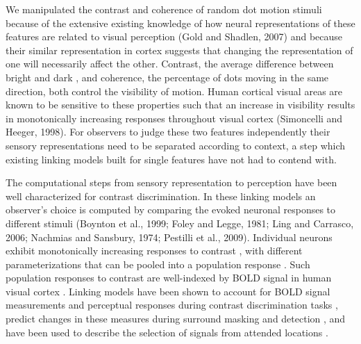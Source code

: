 \documentclass{report}
\begin{document}
We manipulated the contrast and coherence of random dot motion stimuli because of the extensive existing knowledge of how neural representations of these features are related to  visual perception (Gold and Shadlen, 2007) and because their similar representation in cortex suggests that changing the representation of one will necessarily affect the other. Contrast, the average difference between bright and dark \citep{Bex2002-it}, and coherence, the percentage of dots moving in the same direction, both control the visibility of motion. Human cortical visual areas are known to be sensitive to these properties such that an increase in visibility results in monotonically increasing responses throughout visual cortex \citep{Avidan2002-jg,Birman2018-sp,Britten1993-oh,Gardner2005-pg,Logothetis2001-kk,Olman2004-dd,Boynton1996-ff,Olman2004-dd,Rees2000-ul,Tootell1998-bb}(Simoncelli and Heeger, 1998). For observers to judge these two features independently their sensory representations need to be separated according to context, a step which existing linking models built for single features have not had to contend with.

The computational steps from sensory representation to perception have been well characterized for contrast discrimination. In these linking models an observer’s choice is computed by comparing the evoked neuronal responses to different stimuli (Boynton et al., 1999; Foley and Legge, 1981; Ling and Carrasco, 2006; Nachmias and Sansbury, 1974; Pestilli et al., 2009). Individual neurons exhibit monotonically increasing responses to contrast \citep{Albrecht1982-rq}, with different parameterizations \citep{Tolhurst1983-cv} that can be pooled into a population response \citep{Shadlen1996-pr}. Such population responses to contrast are well-indexed by BOLD signal in human visual cortex \citep{Avidan2002-jg,Boynton1996-ff,Boynton1999-jd,Gardner2005-pg,Heeger2000-pq,Logothetis2001-kk}. Linking models have been shown to account for BOLD signal measurements and perceptual responses during contrast discrimination tasks \citep{Boynton1999-jd}, predict changes in these measures during surround masking \citep{Zenger-Landolt2003-kq} and detection \citep{Ress2000-pa}, and have been used to describe the selection of signals from attended locations \citep{Hara2014-mv,Pestilli2011-gi}. 
\end{document}
